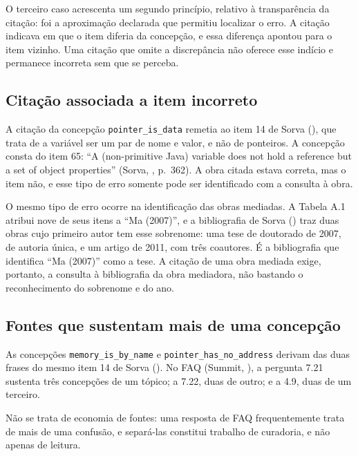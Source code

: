 O terceiro caso acrescenta um segundo princípio, relativo à transparência da citação: foi a aproximação declarada que permitiu localizar o erro. A citação indicava em que o item diferia da concepção, e essa diferença apontou para o item vizinho. Uma citação que omite a discrepância não oferece esse indício e permanece incorreta sem que se perceba.

\subsection{Citação associada a item incorreto}

A citação da concepção \texttt{pointer\_\allowbreak{}is\_\allowbreak{}data} remetia ao item 14 de Sorva (\citeyear{sorva2012}), que trata de a variável ser um par de nome e valor, e não de ponteiros. A concepção consta do item 65: ``A (non-primitive Java) variable does not hold a reference but a set of object properties'' (Sorva, \citeyear{sorva2012}, p.~362). A obra citada estava correta, mas o item não, e esse tipo de erro somente pode ser identificado com a consulta à obra.

O mesmo tipo de erro ocorre na identificação das obras mediadas. A Tabela A.1 atribui nove de seus itens a ``Ma (2007)'', e a bibliografia de Sorva (\citeyear{sorva2012}) traz duas obras cujo primeiro autor tem esse sobrenome: uma tese de doutorado de 2007, de autoria única, e um artigo de 2011, com três coautores. É a bibliografia que identifica ``Ma (2007)'' como a tese. A citação de uma obra mediada exige, portanto, a consulta à bibliografia da obra mediadora, não bastando o reconhecimento do sobrenome e do ano.

\subsection{Fontes que sustentam mais de uma concepção}

As concepções \texttt{memory\_\allowbreak{}is\_\allowbreak{}by\_\allowbreak{}name} e \texttt{pointer\_\allowbreak{}has\_\allowbreak{}no\_\allowbreak{}address} derivam das duas frases do mesmo item 14 de Sorva (\citeyear{sorva2012}). No FAQ (Summit, \citeyear{summit2005}), a pergunta 7.21 sustenta três concepções de um tópico; a 7.22, duas de outro; e a 4.9, duas de um terceiro.

Não se trata de economia de fontes: uma resposta de FAQ frequentemente trata de mais de uma confusão, e separá-las constitui trabalho de curadoria, e não apenas de leitura.

